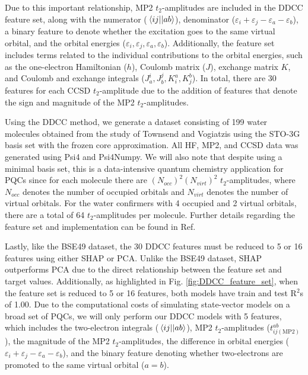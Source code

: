 \documentclass[journal=jacsat,manuscript=article]{achemso}
\begin{document}
Due to this important relationship, MP2 $t_{2}$-amplitudes are included in the DDCC feature set, along with the numerator ($\mel{ij}{}{ab}$), denominator ($\varepsilon_{i}+\varepsilon_{j}-\varepsilon_{a}-\varepsilon_{b}$), a binary feature to denote whether the excitation goes to the same virtual orbital, and the orbital energies ($\varepsilon_{i},\varepsilon_{j},\varepsilon_{a},\varepsilon_{b}$).
Additionally, the feature set includes terms related to the individual contributions to the orbital energies, such as the one-electron Hamiltonian ($h$), Coulomb matrix ($J$), exchange matrix $K$, and Coulomb and exchange integrals ($J^{i}_{a}, J^{j}_{b}, K^{a}_{i}, K^{b}_{j}$).
In total, there are 30 features for each CCSD $t_{2}$-amplitude due to the addition of features that denote the sign and magnitude of the MP2 $t_{2}$-amplitudes.

Using the DDCC method, we generate a dataset consisting of 199 water molecules obtained from the study of Townsend and Vogiatzis using the STO-3G basis set\cite{hehre_selfconsistent_1970}  with the frozen core approximation.
All HF, MP2, and CCSD data was generated using Psi4\cite{parrish_psi4_2017} and Psi4Numpy\cite{smith_psi4numpy_2018}.
We will also note that despite using a minimal basis set, this is a data-intensive quantum chemistry application for PQCs since for each molecule there are $(N_{occ})^{2}(N_{virt})^{2}$ $t_{2}$-amplitudes, where $N_{occ}$ denotes the number of occupied orbitals and $N_{virt}$ denotes the number of virtual orbitals.
For the water confirmers with 4 occupied and 2 virtual orbitals, there are a total of 64 $t_{2}$-amplitudes per molecule.
Further details regarding the feature set and implementation can be found in Ref.  \cite{townsend_data-driven_2019}

Lastly, like the BSE49 dataset, the 30 DDCC features must be reduced to 5 or 16 features using either SHAP or PCA.
Unlike the BSE49 dataset, SHAP outperforms PCA due to the direct relationship between the feature set and target values.
Additionally, as highlighted in Fig. \ref{fig:DDCC_feature_set}, when the feature set is reduced to 5 or 16 features, both models have train and test R$^{2}$s of 1.00.
Due to the computational costs of simulating state-vector models on a broad set of PQCs, we will only perform our DDCC models with 5 features, which includes the two-electron integrals ($\mel{ij}{}{ab}$), MP2 $t_{2}$-amplitudes ($t^{ab}_{ij(\text{MP2})}$), the magnitude of the MP2 $t_{2}$-amplitudes, the difference in orbital energies ($\varepsilon_{i}+\varepsilon_{j}-\varepsilon_{a}-\varepsilon_{b}$), and the binary feature denoting whether two-electrons are promoted to the same virtual orbital ($a=b$).
\end{document}
